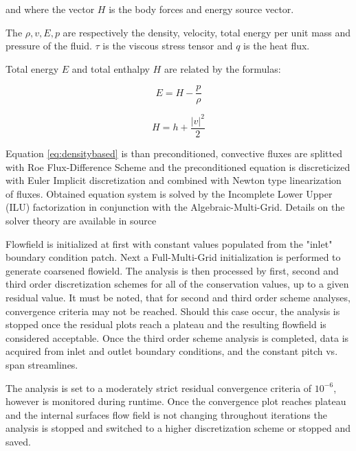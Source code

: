 \noindent and where the vector $H$ is the body forces and energy source vector.

The $\rho, v, E, p$ are respectively the density, velocity, total energy per unit mass and pressure of the fluid. $\tau$ is the viscous stress tensor and $q$ is the heat flux.

Total energy $E$ and total enthalpy $H$ are related by the formulas:

\begin{equation} \label{eq:totalenergy}
E = H - \frac{p}{\rho}
\end{equation}

\begin{equation} \label{eq:totalenthalpy}
H = h + \frac{\lvert v \rvert^2}{2} 
\end{equation}

Equation \ref{eq:densitybased} is than preconditioned, convective fluxes are splitted with Roe Flux-Difference Scheme and the preconditioned equation is discreticized with Euler Implicit discretization and combined with Newton type linearization of fluxes. Obtained equation system is solved by the Incomplete Lower Upper (ILU) factorization in conjunction with the Algebraic-Multi-Grid. Details on the solver theory are available in source \citep{fluenttheory}

Flowfield is initialized at first with constant values populated from the "inlet" boundary condition patch. Next a Full-Multi-Grid initialization is performed to generate coarsened flowield. The analysis is then processed by first, second and third order discretization schemes for all of the conservation values, up to a given residual value. It must be noted, that for second and third order scheme analyses, convergence criteria may not be reached. Should this case occur, the analysis is stopped once the residual plots reach a plateau and the resulting flowfield is considered acceptable. Once the third order scheme analysis is completed, data is acquired from inlet and outlet boundary conditions, and the constant pitch vs. span streamlines.

The analysis is set to a moderately strict residual convergence criteria of $10^{-6}$, however is monitored during runtime. Once the convergence plot reaches plateau and the internal surfaces flow field is not changing throughout iterations the analysis is stopped and switched to a higher discretization scheme or stopped and saved.

